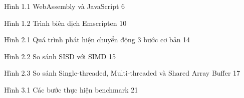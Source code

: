 
Hình 1.1 WebAssembly và JavaScript 6


Hình 1.2 Trình biên dịch Emscripten 10


Hình 2.1 Quá trình phát hiện chuyển động 3 bước cơ bản 14


Hình 2.2 So sánh SISD với SIMD 15


Hình 2.3 So sánh Single-threaded, Multi-threaded và Shared Array Buffer 17


Hình 3.1 Các bước thực hiện benchmark 21
